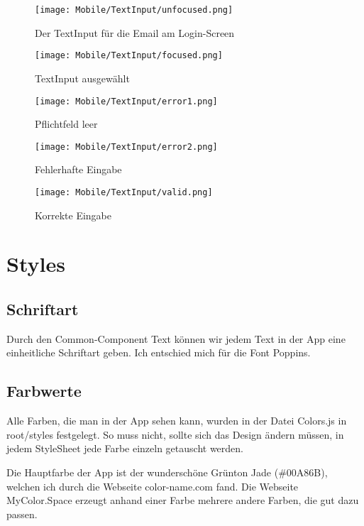 \begin{figure}[H]
  \begin{center}
    \texttt{[image: Mobile/TextInput/unfocused.png]}
    \caption{Der TextInput für die Email am Login-Screen}
  \end{center}
\end{figure}

\begin{figure}[H]
  \begin{center}
    \texttt{[image: Mobile/TextInput/focused.png]}
    \caption{TextInput ausgewählt}
  \end{center}
\end{figure}

\begin{figure}[H]
  \begin{center}
    \texttt{[image: Mobile/TextInput/error1.png]}
    \caption{Pflichtfeld leer}
  \end{center}
\end{figure}

\begin{figure}[H]
  \begin{center}
    \texttt{[image: Mobile/TextInput/error2.png]}
    \caption{Fehlerhafte Eingabe}
  \end{center}
\end{figure}

\begin{figure}[H]
  \begin{center}
    \texttt{[image: Mobile/TextInput/valid.png]}
    \caption{Korrekte Eingabe}
  \end{center}
\end{figure}



\section{Styles}
\subsection{Schriftart}
Durch den Common-Component Text können wir jedem Text in der App eine einheitliche Schriftart geben.
Ich entschied mich für die Font Poppins.

\subsection{Farbwerte}
Alle Farben, die man in der App sehen kann, wurden in der Datei Colors.js in root/styles festgelegt.
So muss nicht, sollte sich das Design ändern müssen, in jedem StyleSheet jede Farbe einzeln
getauscht werden.

Die Hauptfarbe der App ist der wunderschöne Grünton Jade (\#00A86B), welchen ich durch die Webseite
color-name.com \cite{colorName} fand. Die Webseite MyColor.Space \cite{myColorSpace} erzeugt anhand
einer Farbe mehrere andere Farben, die gut dazu passen.
